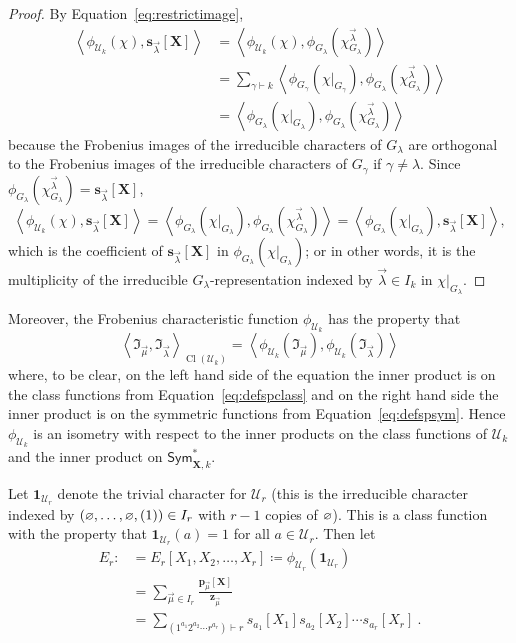 \documentclass[ALCO,Unicode]{cedram}
\newcommand{\ind}{\mathfrak{I}}
\newcommand{\XXX}{\mathbf{X}}
\newcommand{\epart}{\text{\footnotesize$\varnothing$}}
\newcommand{\class}{\operatorname{Cl}}
\begin{document}
\begin{proof}
By Equation~\eqref{eq:restrictimage},
\begin{align*}
\left< \phi_{\mathcal{U}_k}( \chi ), \mathbf{s}_{\vec{\lambda}}[\XXX] \right>
&=\left< \phi_{\mathcal{U}_k}( \chi ),
\phi_{G_\lambda}( \chi^{\vec{\lambda}}_{G_\lambda}) \right>\\
&=
\sum_{\gamma \vdash k}
\left< \phi_{G_\gamma}( \chi |_{G_\gamma}),
\phi_{G_\lambda}( \chi^{\vec{\lambda}}_{G_\lambda}) \right>\\
&=
\left< \phi_{G_\lambda}( \chi |_{G_\lambda}),
\phi_{G_\lambda}( \chi^{\vec{\lambda}}_{G_\lambda}) \right>
\end{align*}
because the Frobenius images of the irreducible characters of $G_\lambda$
are orthogonal to the Frobenius images of the
irreducible characters of $G_\gamma$ if $\gamma \neq \lambda$.
Since $\phi_{G_\lambda}( \chi^{\vec{\lambda}}_{G_\lambda}) =
\mathbf{s}_{\vec{\lambda}}[\XXX]$,
\[
    \left< \phi_{\mathcal{U}_k}( \chi ), \mathbf{s}_{\vec{\lambda}}[\XXX] \right>
    =
    \left< \phi_{G_\lambda}( \chi |_{G_\lambda}),
    \phi_{G_\lambda}( \chi^{\vec{\lambda}}_{G_\lambda}) \right>
    = \left< \phi_{G_\lambda}( \chi |_{G_\lambda}), \mathbf{s}_{\vec{\lambda}}[\XXX] \right>,
\]
which is the coefficient of $\mathbf{s}_{\vec{\lambda}}[\XXX]$ in
$\phi_{G_\lambda}( \chi |_{G_\lambda})$;
or in other words, it is the multiplicity of the
irreducible $G_\lambda$-representation
indexed by $\vec{\lambda} \in I_k$ in $\chi |_{G_\lambda}$.
\end{proof}

Moreover, the Frobenius characteristic function $\phi_{\mathcal{U}_k}$ has the property that
$$\left< \ind_{\vec{\mu}},
\ind_{\vec{\lambda}} \right>_{\class(\mathcal{U}_k)}
= \left< \phi_{\mathcal{U}_k}( \ind_{\vec{\mu}} ),
\phi_{\mathcal{U}_k}( \ind_{\vec{\lambda}} )\right>$$
where, to be clear, on the left hand side of the equation the inner
product is on the class functions from Equation~\eqref{eq:defspclass}
and on the right hand side the inner product is on the symmetric functions
from Equation~\eqref{eq:defspsym}. Hence $\phi_{\mathcal{U}_k}$ is an isometry with respect to the
inner products on the class functions of $\mathcal{U}_k$ and
the inner product on $\mathsf{Sym}^{\ast}_{\XXX,k}$.

Let $\mathbf{1}_{\mathcal{U}_r}$ denote the trivial character for $\mathcal{U}_r$
(this is the irreducible character indexed by $(\epart, \ldots, \epart, (1)) \in I_r$ with $r-1$ copies of $\epart$).
This is a class function with the property that $\mathbf{1}_{\mathcal{U}_r}(a) = 1$ for all $a \in \mathcal{U}_r$.
Then let
\begin{align}
E_r:&= E_r[X_1, X_2, \ldots, X_r] \coloneqq \phi_{\mathcal{U}_r}(\mathbf{1}_{\mathcal{U}_r})\label{def:Ed}\\
&= \sum_{\vec{\mu} \in I_r} \frac{\mathbf{p}_{\vec{\mu}}[\XXX]}{\mathbf{z}_{\vec{\mu}}}\label{eq:Edpexp}\\
&= \sum_{(1^{a_1}2^{a_2}\cdots r^{a_r}) \vdash r}
s_{a_1}[X_1] s_{a_2}[X_2] \cdots s_{a_r}[X_r]~.\label{eq:Edsexp}
\end{align}
\end{document}
